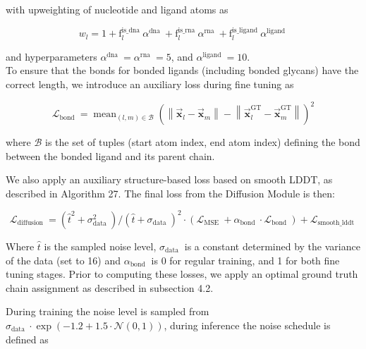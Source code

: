 \documentclass[10pt]{article}
\begin{document}
with upweighting of nucleotide and ligand atoms as


\begin{equation*}
w_{l}=1+\mathrm{f}_{l}^{\text {is_dna }} \alpha^{\text {dna }}+\mathrm{f}_{l}^{\text {is_rna }} \alpha^{\text {rna }}+\mathrm{f}_{l}^{\text {is_ligand }} \alpha^{\text {ligand }} \tag{4}
\end{equation*}


and hyperparameters $\alpha^{\text {dna }}=\alpha^{\text {rna }}=5$, and $\alpha^{\text {ligand }}=10$.\\
To ensure that the bonds for bonded ligands (including bonded glycans) have the correct length, we introduce an auxiliary loss during fine tuning as


\begin{equation*}
\mathcal{L}_{\text {bond }}=\operatorname{mean}_{(l, m) \in \mathcal{B}}\left(\left\|\overrightarrow{\mathbf{x}}_{l}-\overrightarrow{\mathbf{x}}_{m}\right\|-\left\|\overrightarrow{\mathbf{x}}_{l}^{\mathrm{GT}}-\overrightarrow{\mathbf{x}}_{m}^{\mathrm{GT}}\right\|\right)^{2} \tag{5}
\end{equation*}


where $\mathcal{B}$ is the set of tuples (start atom index, end atom index) defining the bond between the bonded ligand and its parent chain.

We also apply an auxiliary structure-based loss based on smooth LDDT, as described in Algorithm 27. The final loss from the Diffusion Module is then:


\begin{equation*}
\mathcal{L}_{\text {diffusion }}=\left(\hat{t}^{2}+\sigma_{\text {data }}^{2}\right) /\left(\hat{t}+\sigma_{\text {data }}\right)^{2} \cdot\left(\mathcal{L}_{\text {MSE }}+\alpha_{\text {bond }} \cdot \mathcal{L}_{\text {bond }}\right)+\mathcal{L}_{\text {smooth_lddt }} \tag{6}
\end{equation*}


Where $\hat{t}$ is the sampled noise level, $\sigma_{\text {data }}$ is a constant determined by the variance of the data (set to 16) and $\alpha_{\text {bond }}$ is 0 for regular training, and 1 for both fine tuning stages. Prior to computing these losses, we apply an optimal ground truth chain assignment as described in subsection 4.2.

During training the noise level is sampled from $\sigma_{\text {data }} \cdot \exp (-1.2+1.5 \cdot \mathcal{N}(0,1))$, during inference the noise schedule is defined as
\end{document}
